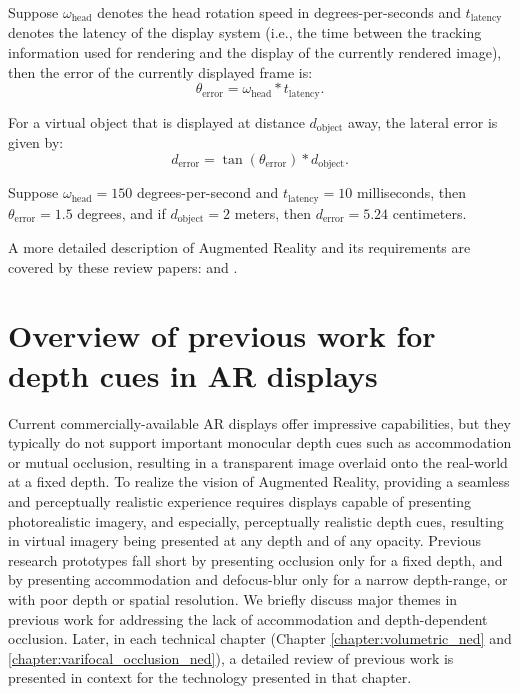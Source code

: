 \begin{enumerate}
Suppose $\omega_{\text{head}}$ denotes the head rotation speed in degrees-per-seconds and $t_{\text{latency}}$ denotes the latency of the display system (i.e., the time between the tracking information used for rendering and the display of the currently rendered image), then the error of the currently displayed frame is:
\begin{equation}
    \theta_{\text{error}} = \omega_{\text{head}} \ast t_{\text{latency}}.
\end{equation}

For a virtual object that is displayed at distance $d_{\text{object}}$ away, the lateral error is given by:
\begin{equation}
    d_{\text{error}} = \tan(\theta_{\text{error}}) \ast d_{\text{object}}.
\end{equation}

Suppose $\omega_{\text{head}} = 150$ degrees-per-second and $t_{\text{latency}} = 10$ milliseconds, then $\theta_{\text{error}}=1.5$ degrees, and if $d_{\text{object}}=2$ meters, then $d_{\text{error}}=5.24$ centimeters.


\end{enumerate}
A more detailed description of Augmented Reality and its requirements are covered by these review papers: \citet{azuma2001recent} and \citet{carmigniani2011augmented}. 

\section{Overview of previous work for depth cues in AR displays}
\label{sec:background:previous_work_ar}
Current commercially-available AR displays offer impressive capabilities, but they typically do not support important monocular depth cues such as accommodation or mutual occlusion, resulting in a transparent image overlaid onto the real-world at a fixed depth. 
To realize the vision of Augmented Reality, providing a seamless and perceptually realistic experience requires displays capable of presenting photorealistic imagery, and especially, perceptually realistic depth cues, resulting in virtual imagery being presented at any depth and of any opacity. 
Previous research prototypes fall short by presenting occlusion only for a fixed depth, and by presenting accommodation and defocus-blur only for a narrow depth-range, or with poor depth or spatial resolution. 
We briefly discuss major themes in previous work for addressing the lack of accommodation and depth-dependent occlusion. 
Later, in each technical chapter (Chapter \ref{chapter:volumetric_ned} and \ref{chapter:varifocal_occlusion_ned}), a detailed review of previous work is presented in context for the technology presented in that chapter.

